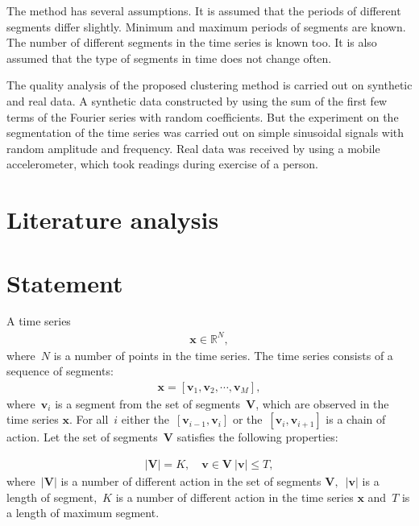 \documentclass[12pt, twoside]{article}
\numberwithin{equation}{section}
\begin{document}
The method has several assumptions.
It is assumed that the periods of different segments differ slightly. Minimum and maximum periods of segments are known. The number of different segments in the time series is known too.
It is also assumed that the type of segments in time does not change often.

The quality analysis of the proposed clustering method is carried out on synthetic and real data.
A synthetic data constructed by using the sum of the first few terms of the Fourier series with random coefficients. But the experiment on the segmentation of the time series was carried out on simple sinusoidal signals with random amplitude and frequency.
Real data was received by using a mobile accelerometer, which took readings during exercise of a person.

\section{Literature analysis}

\section{Statement}
A time series
\begin{equation}
\label{eq:st:1}
\begin{aligned}
\textbf{x} \in \mathbb{R}^{N},
\end{aligned}
\end{equation}
where~$N$ is a number of points in the time series. The time series consists of a sequence of segments:
\begin{equation}
\label{eq:st:2}
\begin{aligned}
\textbf{x} = [\textbf{v}_1, \textbf{v}_2, \cdots, \textbf{v}_M],
\end{aligned}
\end{equation}
where~$\textbf{v}_i$ is a segment from the set of segments~$\mathbf{V}$, which are observed in the time series $\textbf{x}$. 
For all~$i$ either the~$[\textbf{v}_{i-1},\textbf{v}_{i}]$ or the~$[\textbf{v}_{i},\textbf{v}_{i+1}]$  is a  chain of action. Let the set of segments~$\mathbf{V}$ satisfies the following properties:

\begin{equation}
\label{eq:st:3}
\begin{aligned}
\left|\mathbf{V}\right| = K, \quad \textbf{v} \in \mathbf{V}~\left|\textbf{v}\right| \leq T,
\end{aligned}
\end{equation}
where~$\left|\mathbf{V}\right|$ is a number of different action in the set of segments $\mathbf{V},$~$\left|\textbf{v}\right|$ is a length of segment,~$K$ is a number of different action in the time series $\textbf{x}$ and~$T$ is a length of maximum segment.
\end{document}

